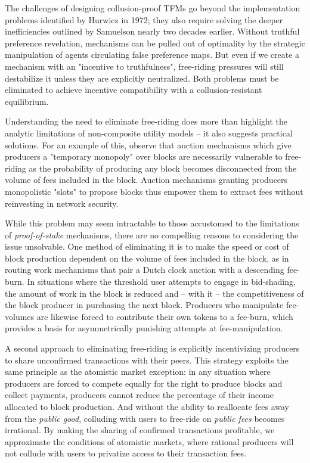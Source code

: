 \documentclass[oneside]{article}   	%
\begin{document}
The challenges of designing collusion-proof TFMs go beyond the implementation problems identified by Hurwicz in 1972; they also require solving the deeper inefficiencies outlined by Samuelson nearly two decades earlier. Without truthful preference revelation, mechanisms can be pulled out of optimality by the strategic manipulation of agents circulating false preference maps. But even if we create a mechanism with an "incentive to truthfulness", free-riding pressures will still destabilize it unless they are explicitly neutralized. Both problems must be eliminated to achieve incentive compatibility with a collusion-resistant equilibrium.

Understanding the need to eliminate free-riding does more than highlight the analytic limitations of non-composite utility models -- it also suggests practical solutions. For an example of this, observe that auction mechanisms which give producers a "temporary monopoly" over blocks are necessarily vulnerable to free-riding as the probability of producing any block becomes disconnected from the volume of fees included in the block. Auction mechanisms granting producers monopolistic "slots" to propose blocks thus empower them to extract fees without reinvesting in network security.

While this problem may seem intractable to those accustomed to the limitations of \textit{proof-of-stake} mechanisms, there are no compelling reasons to considering the issue unsolvable. One method of eliminating it is to make the speed or cost of block production dependent on the volume of fees included in the block, as in routing work mechanisms that pair a Dutch clock auction with a descending fee-burn. In situations where the threshold user attempts to engage in bid-shading, the amount of work in the block is reduced and -- with it -- the competitiveness of the block producer in purchasing the next block. Producers who manipulate fee-volumes are likewise forced to contribute their own tokens to a fee-burn, which provides a basis for asymmetrically punishing attempts at fee-manipulation.

A second approach to eliminating free-riding is explicitly incentivizing producers to share unconfirmed transactions with their peers. This strategy exploits the same principle as the atomistic market exception: in any situation where producers are forced to compete equally for the right to produce blocks and collect payments, producers cannot reduce the percentage of their income allocated to block production. And without the ability to reallocate fees away from the \textit{public good}, colluding with users to free-ride on \textit{public fees} becomes irrational. By making the sharing of confirmed transactions profitable, we approximate the conditions of atomistic markets, where rational producers will not collude with users to privatize access to their transaction fees.
\end{document}

